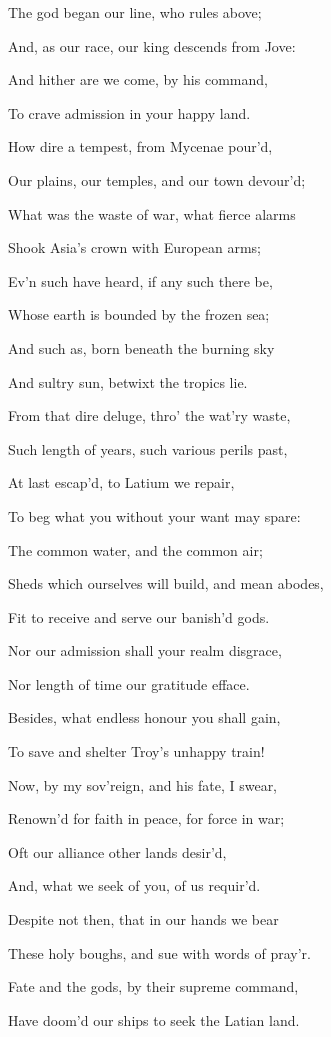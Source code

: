 The god began our line, who rules above;

And, as our race, our king descends from Jove:

And hither are we come, by his command,

To crave admission in your happy land.

How dire a tempest, from Mycenae pour’d,

Our plains, our temples, and our town devour’d;

What was the waste of war, what fierce alarms

Shook Asia’s crown with European arms;

Ev’n such have heard, if any such there be,

Whose earth is bounded by the frozen sea;

And such as, born beneath the burning sky

And sultry sun, betwixt the tropics lie.

From that dire deluge, thro’ the wat’ry waste,

Such length of years, such various perils past,

At last escap’d, to Latium we repair,

To beg what you without your want may spare:

The common water, and the common air;

Sheds which ourselves will build, and mean abodes,

Fit to receive and serve our banish’d gods.

Nor our admission shall your realm disgrace,

Nor length of time our gratitude efface.

Besides, what endless honour you shall gain,

To save and shelter Troy’s unhappy train!

Now, by my sov’reign, and his fate, I swear,

Renown’d for faith in peace, for force in war;

Oft our alliance other lands desir’d,

And, what we seek of you, of us requir’d.

Despite not then, that in our hands we bear

These holy boughs, and sue with words of pray’r.

Fate and the gods, by their supreme command,

Have doom’d our ships to seek the Latian land.

